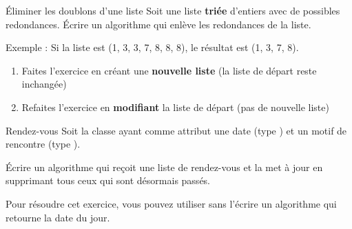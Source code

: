 \begin{Exercice}{Éliminer les doublons d'une liste}
	Soit une liste \textbf{triée}
	d'entiers avec de possibles redondances. Écrire un
	algorithme qui enlève les redondances de la liste.

	Exemple : Si la liste est (1, 3, 3, 7, 8, 8, 8),
	le résultat est (1, 3, 7, 8).

	\begin{enumerate}[label=\alph*)]
		\item
		      Faites l'exercice en créant une \textbf{nouvelle
			      liste} (la liste de départ reste inchangée)
		\item
		      Refaites l'exercice en \textbf{modifiant}
		      la liste de départ (pas de nouvelle liste)
	\end{enumerate}
\end{Exercice}

\begin{Exercice}{Rendez-vous}
	Soit la classe  
	ayant comme attribut 
	une date (type )
	et un motif de rencontre (type ).

	Écrire un algorithme qui reçoit une liste de rendez-vous
	et la met à jour en supprimant tous ceux qui sont désormais passés.

	Pour résoudre cet exercice, vous pouvez utiliser sans l'écrire
	un algorithme  qui retourne la date du jour.
\end{Exercice}